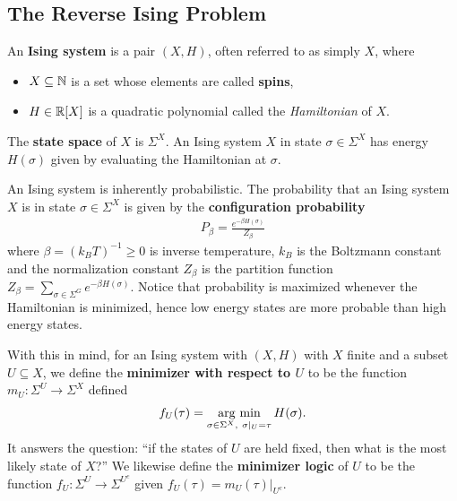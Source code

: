 \documentclass{article}
\begin{document}
\subsection{The Reverse Ising Problem}

\begin{defn}\label{defn:ising-system}
  An \textbf{Ising system} is a pair $(X, H)$, often referred to as simply $X$, where
  \begin{itemize}
    \item $X \subseteq \mathbb{N}$ is a set whose elements are called \textbf{spins},
    \item $H \in \mathbb{R}[X]$ is a quadratic polynomial called the \emph{Hamiltonian} of $X$.
  \end{itemize}
  The \textbf{state space} of $X$ is $\Sigma^X$. An Ising system $X$ in state $\sigma \in \Sigma^X$ has energy $H(\sigma)$ given by evaluating the Hamiltonian at $\sigma$.
\end{defn}

An Ising system is inherently probabilistic. The probability that an Ising system $X$ is in state $\sigma \in \Sigma^X$ is given by the \textbf{configuration probability}
\begin{align*}
  P_\beta = \frac{e^{-\beta H(\sigma)}}{Z_\beta}
\end{align*}
where $\beta = (k_BT)^{-1} \geq 0$ is inverse temperature, $k_B$ is the Boltzmann constant and the normalization constant $Z_\beta$ is the partition function $Z_\beta = \sum_{\sigma \in \Sigma^G} e^{-\beta H(\sigma)}$. Notice that probability is maximized whenever the Hamiltonian is minimized, hence low energy states are more probable than high energy states.

With this in mind, for an Ising system with $(X,H)$ with $X$ finite and a subset $U \subseteq X$, we define the \textbf{minimizer with respect to $U$} to be the function $m_U: \Sigma^U \to \Sigma^{X}$ defined
\begin{align*}
f_U(\tau) = \operatorname*{arg ~ min}_{\sigma \in \Sigma^X, ~\sigma|_U = \tau} H(\sigma).
\end{align*}
It answers the question: ``if the states of $U$ are held fixed, then what is the most likely state of $X$?'' We likewise define the \textbf{minimizer logic} of $U$ to be the function $f_U:\Sigma^U \to \Sigma^{U^c}$ given $f_U(\tau) = m_U(\tau)|_{U^c}$.

\bigskip
\end{document}
